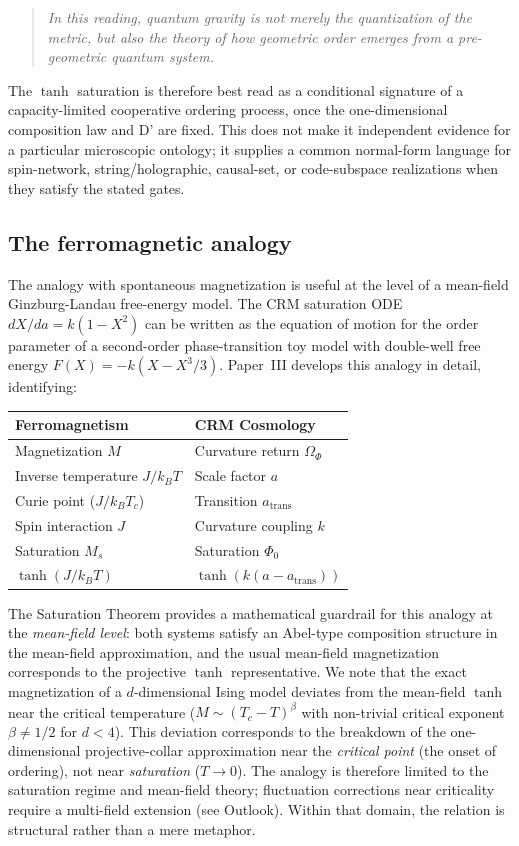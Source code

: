 \documentclass[aps,prd,twocolumn,superscriptaddress,nofootinbib]{revtex4-2}
\begin{document}
\begin{quote}
\textit{In this reading, quantum gravity is not merely the quantization of the metric, but also the theory of how geometric order emerges from a pre-geometric quantum system.}
\end{quote}

The $\tanh$ saturation is therefore best read as a conditional signature of a capacity-limited cooperative ordering process, once the one-dimensional composition law and D' are fixed. This does not make it independent evidence for a particular microscopic ontology; it supplies a common normal-form language for spin-network, string/holographic, causal-set, or code-subspace realizations when they satisfy the stated gates.

\subsection{The ferromagnetic analogy}

The analogy with spontaneous magnetization is useful at the level of a mean-field Ginzburg-Landau free-energy model. The CRM saturation ODE $dX/da = k(1 - X^2)$ can be written as the equation of motion for the order parameter of a second-order phase-transition toy model with double-well free energy $F(X) = -k(X - X^3/3)$. Paper~III \cite{Geiger2026c} develops this analogy in detail, identifying:

\begin{center}
\begin{tabular}{ll}
\hline
Ferromagnetism & CRM Cosmology \\
\hline
Magnetization $M$ & Curvature return $\Omega_\Phi$ \\
Inverse temperature $J/k_BT$ & Scale factor $a$ \\
Curie point ($J/k_BT_c$) & Transition $a_{\mathrm{trans}}$ \\
Spin interaction $J$ & Curvature coupling $k$ \\
Saturation $M_s$ & Saturation $\Phi_0$ \\
$\tanh(J/k_BT)$ & $\tanh(k(a - a_{\mathrm{trans}}))$ \\
\hline
\end{tabular}
\end{center}

The Saturation Theorem provides a mathematical guardrail for this analogy at the \textit{mean-field level}: both systems satisfy an Abel-type composition structure in the mean-field approximation, and the usual mean-field magnetization corresponds to the projective $\tanh$ representative. We note that the exact magnetization of a $d$-dimensional Ising model deviates from the mean-field $\tanh$ near the critical temperature ($M \sim (T_c - T)^{\beta}$ with non-trivial critical exponent $\beta \neq 1/2$ for $d < 4$). This deviation corresponds to the breakdown of the one-dimensional projective-collar approximation near the \textit{critical point} (the onset of ordering), not near \textit{saturation} ($T \to 0$). The analogy is therefore limited to the saturation regime and mean-field theory; fluctuation corrections near criticality require a multi-field extension (see Outlook). Within that domain, the relation is structural rather than a mere metaphor.
\end{document}
